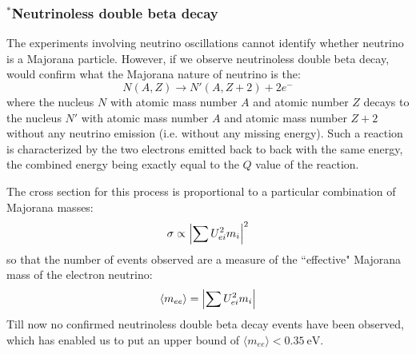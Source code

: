 \subsubsection{$^\ast$Neutrinoless double beta decay}

The experiments involving neutrino oscillations cannot identify whether neutrino is a Majorana particle. However, if we observe neutrinoless double beta decay, would confirm what the Majorana nature of neutrino is the:
\begin{equation}
    N (A, Z) \to N '(A, Z + 2) + 2e^-
\end{equation}
where the nucleus $N$ with atomic mass number $A$ and atomic number $Z$ decays to the nucleus $N'$ with atomic mass number $A$ and atomic mass number $Z + 2$ without any neutrino emission (i.e. without any missing energy). Such a reaction is characterized by the two electrons emitted back to back with the same energy, the combined energy being exactly equal to the $Q$ value of the reaction.

The cross section for this process is proportional to a particular combination of Majorana masses:
\begin{equation}
    \sigma \propto \abs{\sum U^2 _{ei} m_i}^2
\end{equation}
so that the number of events observed are a measure of the ``effective" Majorana mass of the electron neutrino:
\begin{equation}
    \langle m_{ee} \rangle = \abs{\sum U^2 _{ei} m_i}
\end{equation}
Till now no confirmed neutrinoless double beta decay events have been observed, which has enabled us to put an upper bound of \(\langle m_{ee} \rangle < 0.35~\mathrm{eV}\).\cite{Aalseth:2004hb}